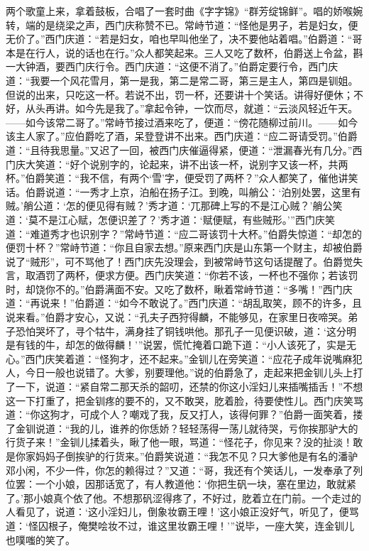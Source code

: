 两个歌童上来，拿着鼓板，合唱了一套时曲《字字锦》“群芳绽锦鲜”。唱的娇喉婉转，端的是绕梁之声，西门庆称赞不已。常峙节道：“怪他是男子，若是妇女，便无价了。”西门庆道：“若是妇女，咱也早叫他坐了，决不要他站着唱。”伯爵道：“哥本是在行人，说的话也在行。”众人都笑起来。三人又吃了数杯，伯爵送上令盆，斟一大钟酒，要西门庆行令。西门庆道：“这便不消了。”伯爵定要行令，西门庆道：“我要一个风花雪月，第一是我，第二是常二哥，第三是主人，第四是钏姐。但说的出来，只吃这一杯。若说不出，罚一杯，还要讲十个笑话。讲得好便休；不好，从头再讲。如今先是我了。”拿起令钟，一饮而尽，就道：“云淡风轻近午天。——如今该常二哥了。”常峙节接过酒来吃了，便道：“傍花随柳过前川。——如今该主人家了。”应伯爵吃了酒，呆登登讲不出来。西门庆道：“应二哥请受罚。”伯爵道：“且待我思量。”又迟了一回，被西门庆催逼得紧，便道：“泄漏春光有几分。”西门庆大笑道：“好个说别字的，论起来，讲不出该一杯，说别字又该一杯，共两杯。”伯爵笑道：“我不信，有两个‘雪’字，便受罚了两杯？”众人都笑了，催他讲笑话。伯爵说道：“一秀才上京，泊船在扬子江。到晚，叫艄公：‘泊别处罢，这里有贼。’艄公道：‘怎的便见得有贼？’秀才道：‘兀那碑上写的不是江心贼？’艄公笑道：‘莫不是江心赋，怎便识差了？’秀才道：‘赋便赋，有些贼形。’”西门庆笑道：“难道秀才也识别字？”常峙节道：“应二哥该罚十大杯。”伯爵失惊道：“却怎的便罚十杯？”常峙节道：“你且自家去想。”原来西门庆是山东第一个财主，却被伯爵说了“贼形”，可不骂他了！西门庆先没理会，到被常峙节这句话提醒了。伯爵觉失言，取酒罚了两杯，便求方便。西门庆笑道：“你若不该，一杯也不强你；若该罚时，却饶你不的。”伯爵满面不安。又吃了数杯，瞅着常峙节道：“多嘴！”西门庆道：“再说来！”伯爵道：“如今不敢说了。”西门庆道：“胡乱取笑，顾不的许多，且说来看。”伯爵才安心，又说：“孔夫子西狩得麟，不能够见，在家里日夜啼哭。弟子恐怕哭坏了，寻个牯牛，满身挂了铜钱哄他。那孔子一见便识破，道：‘这分明是有钱的牛，却怎的做得麟！’”说罢，慌忙掩着口跪下道：“小人该死了，实是无心。”西门庆笑着道：“怪狗才，还不起来。”金钏儿在旁笑道：“应花子成年说嘴麻犯人，今日一般也说错了。大爹，别要理他。”说的伯爵急了，走起来把金钏儿头上打了一下，说道：“紧自常二那天杀的韶叨，还禁的你这小淫妇儿来插嘴插舌！”不想这一下打重了，把金钏疼的要不的，又不敢哭，肐着脸，待要使性儿。西门庆笑骂道：“你这狗才，可成个人？嘲戏了我，反又打人，该得何罪？”伯爵一面笑着，搂了金钏说道：“我的儿，谁养的你恁娇？轻轻荡得一荡儿就待哭，亏你挨那驴大的行货子来！”金钏儿揉着头，瞅了他一眼，骂道：“怪花子，你见来？没的扯淡！敢是你家妈妈子倒挨驴的行货来。”伯爵笑说道：“我怎不见？只大爹他是有名的潘驴邓小闲，不少一件，你怎的赖得过？”又道：“哥，我还有个笑话儿，一发奉承了列位罢：一个小娘，因那话宽了，有人教道他：‘你把生矾一块，塞在里边，敢就紧了。’那小娘真个依了他。不想那矾涩得疼了，不好过，肐着立在门前。一个走过的人看见了，说道：‘这小淫妇儿，倒象妆霸王哩！’这小娘正没好气，听见了，便骂道：‘怪囚根子，俺樊哙妆不过，谁这里妆霸王哩！’”说毕，一座大笑，连金钏儿也噗嗤的笑了。

